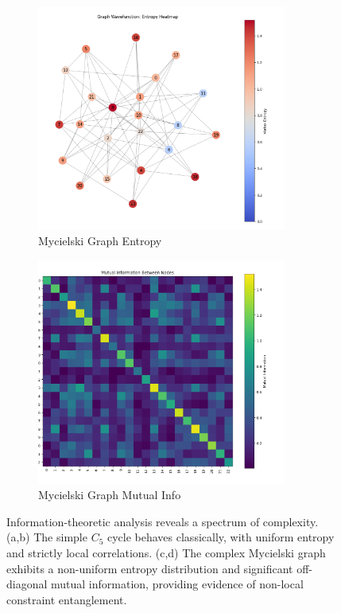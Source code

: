 \documentclass[12pt, letterpaper]{article}
\begin{document}
\begin{figure}[h!]
    \vspace{1cm}
    
    \begin{subfigure}[b]{0.48\textwidth}
        \includegraphics[width=0.9\textwidth]{images/Mycielski_Graph_Entropy_Map.png}
        \caption{Mycielski Graph Entropy}
        \label{fig:groetzsch_entropy}
    \end{subfigure}
    \hfill
    \begin{subfigure}[b]{0.48\textwidth}
        \includegraphics[width=0.9\textwidth]{images/Mycielski_Graph_Mutal_Info_Matrix.png}
        \caption{Mycielski Graph Mutual Info}
        \label{fig:groetzsch_mi}
    \end{subfigure}
    \caption{Information-theoretic analysis reveals a spectrum of complexity. (a,b) The simple $C_5$ cycle behaves classically, with uniform entropy and strictly local correlations. (c,d) The complex Mycielski graph exhibits a non-uniform entropy distribution and significant off-diagonal mutual information, providing evidence of non-local constraint entanglement.}
    \label{fig:results}
\end{figure}
\end{document}
